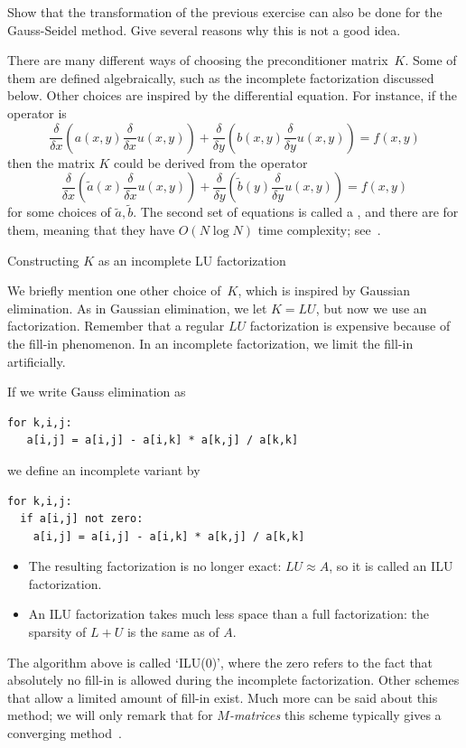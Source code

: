 \begin{exercise}
  Show that the transformation of the previous exercise can also be
  done for the Gauss-Seidel method. Give several reasons why this is
  not a good idea.
\end{exercise}

There are  many different ways of choosing the preconditioner
matrix~$K$. Some of them are defined algebraically, such as the
incomplete factorization discussed below. Other choices are inspired
by the differential equation. For instance, if the operator is
\[ \frac\delta{\delta x}(a(x,y)\frac\delta{\delta x}u(x,y)) +
   \frac\delta{\delta y}(b(x,y)\frac\delta{\delta y}u(x,y)) = f(x,y)
\]
then the matrix $K$ could be derived from the operator
\[ \frac\delta{\delta x}(\tilde a(x)\frac\delta{\delta x}u(x,y)) +
   \frac\delta{\delta y}(\tilde b(y)\frac\delta{\delta y}u(x,y)) = f(x,y)
\]
for some choices of $\tilde a,\tilde b$. The second set of equations
is called a , and there are
 for them, meaning that they have $O(N\log N)$
time complexity; see~\cite{Wi:fastseparable}.

 {Constructing $K$ as an incomplete LU factorization}
\label{sec:ilu}

We briefly mention one other choice of~$K$, which is inspired by
Gaussian elimination. As in Gaussian elimination, we let $K=LU$, but
now we use an  factorization. Remember that a
regular $LU$ factorization is expensive because of the fill-in
phenomenon. In an incomplete factorization, we limit the fill-in
artificially.

If we write Gauss elimination as
\begin{verbatim}
for k,i,j:
   a[i,j] = a[i,j] - a[i,k] * a[k,j] / a[k,k]
\end{verbatim}
we define an incomplete variant by
\begin{verbatim}
for k,i,j:
  if a[i,j] not zero:
    a[i,j] = a[i,j] - a[i,k] * a[k,j] / a[k,k]
\end{verbatim}
\begin{itemize}
\item The resulting factorization is no longer exact: $LU\approx A$,
  so it is called an \acf{ILU} factorization.
\item An \ac{ILU} factorization takes much less space than a full
  factorization: the sparsity of $L+U$ is the same as of $A$.
\end{itemize}
The algorithm above is called `ILU(0)', where the zero refers to the
fact that absolutely no fill-in is allowed during the incomplete
factorization.  Other schemes that allow a limited amount of fill-in
exist.  Much more can be said about this method; we will only remark
that for \emph{$M$-matrices}
this scheme typically gives a converging
method~\cite{MevdVo:itsol}.

